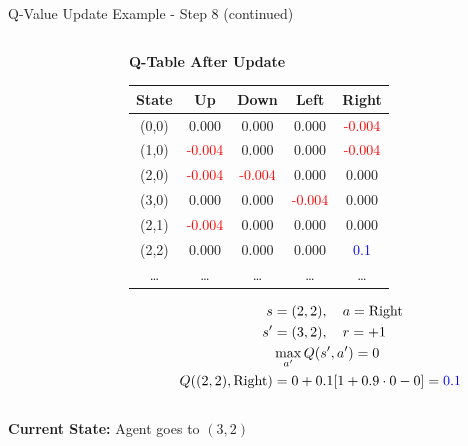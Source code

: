 \documentclass[aspectratio=169]{beamer}
\begin{document}
\begin{frame}{Q-Value Update Example - Step 8 (continued)}
\begin{columns}
\begin{column}{0.5\textwidth}

            
        \end{column}
        
        \begin{column}{0.5\textwidth}

            \textbf{Q-Table After Update}
            \small
            \begin{table}[h]
                \centering
                \begin{tabular}{|c|c|c|c|c|}
                    \hline
                    \textbf{State} & \textbf{Up} & \textbf{Down} & \textbf{Left} & \textbf{Right} \\
                    \hline
                    (0,0) & 0.000 & 0.000 & 0.000 & \textcolor{red}{-0.004} \\
                    (1,0) & \textcolor{red}{-0.004} & 0.000 & 0.000 & \textcolor{red}{-0.004} \\
                    (2,0) & \textcolor{red}{-0.004} & \textcolor{red}{-0.004} & 0.000 & 0.000 \\
                    (3,0) & 0.000 & 0.000 & \textcolor{red}{-0.004} & 0.000 \\
                    (2,1) & \textcolor{red}{-0.004} & 0.000 & 0.000 & 0.000 \\
                    (2,2) & 0.000 & 0.000 & 0.000 & \textcolor{blue}{0.1} \\
                    \dots & \dots & \dots & \dots & \dots \\
                    \hline
                \end{tabular}
            \end{table}

            \vspace{-0.82cm}

                \begin{align}
                s &= (2,2), \quad a = \text{Right} \\
                s' &= (3,2), \quad r = +1 \\
                & \max_{a'}Q(s',a') = 0 \\
                Q((2,2),\text{Right}) &= 0 + 0.1[1 + 0.9 \cdot 0 - 0] = \textcolor{blue}{0.1}
            \end{align}
            
            
            

        \end{column}
    \end{columns}

    \textbf{Current State:} Agent goes to $(3,2)$

\end{frame}
\end{document}
